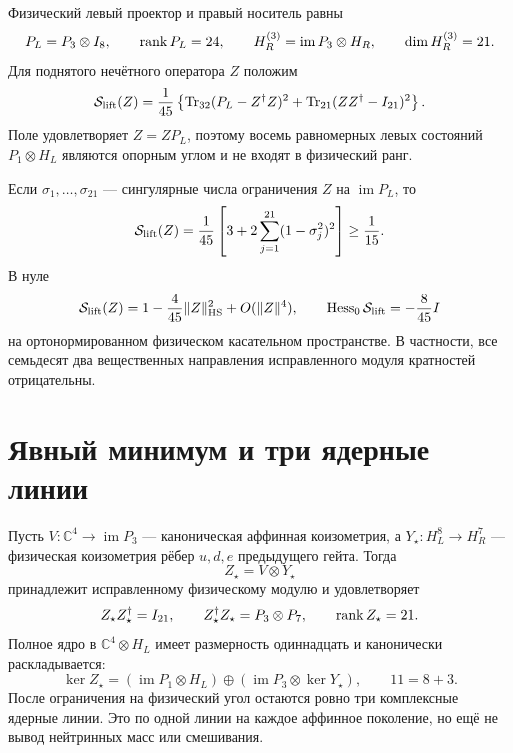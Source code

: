 Физический левый проектор и правый носитель равны
\begin{equation}
 P_L=P_3\otimes I_8,
 \qquad
 \operatorname{rank} P_L=24,
 \qquad
 H_R^{(3)}=\operatorname{im}P_3\otimes H_R,
 \qquad
 \dim H_R^{(3)}=21.
\end{equation}
Для поднятого нечётного оператора $Z$ положим
\begin{equation}
 \mathcal S_{\rm lift}(Z)
 =\frac1{45}\left\{
 \operatorname{Tr}_{32}(P_L-Z^\dagger Z)^2
 +\operatorname{Tr}_{21}(ZZ^\dagger-I_{21})^2
 \right\}.
 \label{eq:v7-lifted-hodge-parent}
\end{equation}
Поле удовлетворяет $Z=ZP_L$, поэтому восемь равномерных левых состояний
$P_1\otimes H_L$ являются опорным углом и не входят в физический ранг.

Если $\sigma_1,\ldots,\sigma_{21}$ --- сингулярные числа ограничения $Z$ на
$\operatorname{im}P_L$, то
\begin{equation}
 \mathcal S_{\rm lift}(Z)
 =\frac1{45}\left[
 3+2\sum_{j=1}^{21}(1-\sigma_j^2)^2
 \right]\ge\frac1{15}.
 \label{eq:v7-lifted-singular-value-action}
\end{equation}
В нуле
\begin{equation}
 \mathcal S_{\rm lift}(Z)
 =1-\frac4{45}\|Z\|_{\rm HS}^2+O(\|Z\|^4),
 \qquad
 \operatorname{Hess}_0\mathcal S_{\rm lift}=-\frac8{45}I
 \label{eq:v7-lifted-negative-hessian}
\end{equation}
на ортонормированном физическом касательном пространстве. В частности, все
семьдесят два вещественных направления исправленного модуля кратностей
отрицательны.

\section{Явный минимум и три ядерные линии}

Пусть $V:\mathbb C^4\to\operatorname{im}P_3$ --- каноническая аффинная
коизометрия, а $Y_\star:H_L^8\to H_R^7$ --- физическая коизометрия рёбер
$u,d,e$ предыдущего гейта. Тогда
\begin{equation}
 Z_\star=V\otimes Y_\star
 \label{eq:v7-factorized-three-generation-vacuum}
\end{equation}
принадлежит исправленному физическому модулю и удовлетворяет
\begin{equation}
 Z_\star Z_\star^\dagger=I_{21},
 \qquad
 Z_\star^\dagger Z_\star=P_3\otimes P_7,
 \qquad
 \operatorname{rank} Z_\star=21.
\end{equation}
Полное ядро в $\mathbb C^4\otimes H_L$ имеет размерность одиннадцать и
канонически раскладывается:
\begin{equation}
 \ker Z_\star
 =(\operatorname{im}P_1\otimes H_L)
 \oplus
 (\operatorname{im}P_3\otimes\ker Y_\star),
 \qquad
 11=8+3.
 \label{eq:v7-kernel-reference-physical-split}
\end{equation}
После ограничения на физический угол остаются ровно три комплексные ядерные
линии. Это по одной линии на каждое аффинное поколение, но ещё не вывод
нейтринных масс или смешивания.


